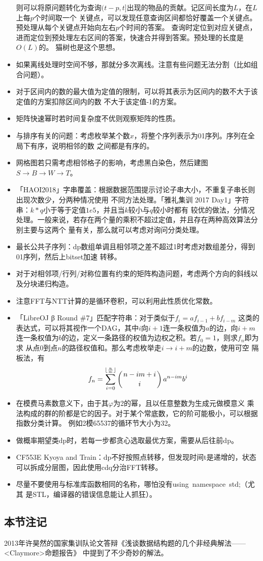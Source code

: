 \begin{itemize}
	则可以将原问题转化为查询$(t-p,t]$出现的物品的贡献。记区间长度为$L$，在$L$上每$p$个时间取一个
	关键点，可以发现任意查询区间都恰好覆盖一个关键点。预处理从每个关键点开始向左右$p$个时间的答案。
	查询时定位到对应关键点，进而定位到预处理左右区间的答案，快速合并得到答案。预处理的长度是$O(L)$的。
	猫树也是这个思想。
	\item 如果离线处理时空间不够，那就分多次离线。注意有些问题无法分割（比如组合问题）。
	\item 对于区间内的数的最大值为定值的限制，可以将其表示为区间内的数不大于该定值的方案扣除区间内的数
	不大于该定值-1的方案。
	\item 矩阵快速幂时若时间复杂度不优则观察矩阵的性质。
	\item 与排序有关的问题：考虑枚举某个数$x$，将整个序列表示为01序列。序列在全局下有序，说明相邻的数
	之间都是有序的。
	\item 网格图若只需考虑相邻格子的影响，考虑黑白染色，然后建图
	$S\rightarrow B\rightarrow W\rightarrow T$。
	\item 「HAOI2018」字串覆盖：根据数据范围提示讨论子串大小，不重复子串长则出现次数少，分两种情况使用
	不同方法处理。「雅礼集训 2017 Day1」字符串：$k*q$小于等于定值$1e5$，并且当$k$较小与$q$较小时都有
	较优的做法，分情况处理。一般来说，若存在两个量的乘积不超过定值，并且存在两种高效算法分别主要与这两个
	量有关，那么就可以考虑对询问分类处理。
	\item 最长公共子序列：dp数组单调且相邻项之差不超过1时考虑对数组差分，得到01序列，然后上bitset加速
	转移。
	\item 对于对相邻项/行列/对称位置有约束的矩阵构造问题，考虑两个方向的斜线以及分块递归构造。
	\item 注意FFT与NTT计算的是循环卷积，可以利用此性质优化常数。
	\item 「LibreOJ β Round \#7」匹配字符串：对于类似于$f_i=af_{i-1}+bf_{i-m}$
	这类的表达式，可以将其视作一个DAG，其中$i$向$i+1$连一条权值为$a$的边，向$i+m$
	连一条权值为$b$的边，定义一条路径的权值为边权之积。若$f_0=1$，则求$f_n$即为求
	从点0到点$n$的路径权值和。那么考虑枚举走$i\rightarrow i+m$的边数，使用可空
	隔板法，有
	\begin{displaymath}
		f_n=\sum_{i=0}^{\lfloor\frac{n}{m}\rfloor}{\left(n-im+i \atop i\right)a^{n-im}b^i}
	\end{displaymath}
	\item 在模费马素数意义下，由于其$\varphi$为2的幂，且以任意整数为生成元做模意义
	乘法构成的群的阶都是它的因子。对于某个常底数，它的阶可能极小，可以根据指数分类计算。
	例如2模65537的循环节大小为32。
	\item 做概率期望类dp时，若每一步都贪心选取最优方案，需要从后往前dp。
	\item CF553E Kyoya and Train：dp不好按照点转移，但发现时间t是递增的，状态
	可以拆成分层图，因此使用cdq分治FFT转移。
	\item 尽量不要使用与标准库函数相同的名称，哪怕没有using~namespace~std;（尤其
	是STL，编译器的错误信息能让人抓狂）。
\end{itemize}
\subsection{本节注记}
2013年许昊然的国家集训队论文答辩《浅谈数据结构题的几个非经典解法——<Claymore>命题报告》
中提到了不少奇妙的解法。
